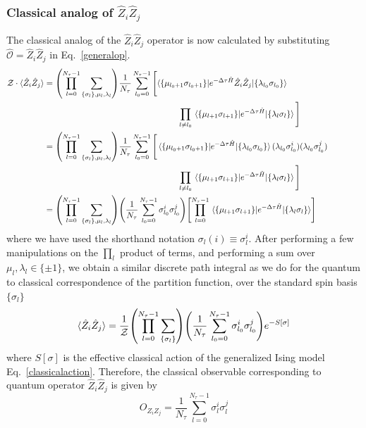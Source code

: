 \documentclass[../thesis_main.tex]{subfiles}
\begin{document}
\subsubsection{Classical analog of $\hat{Z}_i \hat{Z}_j$}
The classical analog of the $\hat{Z}_i \hat{Z}_j$ operator is now calculated by substituting $\hat{\mathcal{O}} =  \hat{Z}_i \hat{Z}_j$ in Eq.~\eqref{generalop}.
\begingroup
\allowdisplaybreaks
\begin{align}
    \mathcal{Z} \cdot \langle {\hat{Z}_i \hat{Z}_j} \rangle &= \qty(\prod_{l=0}^{N_\tau - 1} \sum_{\{\sigma_l \}, \mu_l, \lambda_l}) \frac{1}{N_\tau} \sum_{l_0 = 0}^{N_\tau - 1} \Bigg[\langle\{\mu_{l_0+1} \sigma _{l_0+1}\}|{e^{-\Delta \tau \hat{H}}{\hat{Z}_i \hat{Z}_j}}|{\{\lambda_{l_0} \sigma _{l_0}\}} \rangle \qquad \qquad \nonumber\\
    &\qquad \qquad \qquad \qquad \qquad \qquad \qquad \qquad \prod_{l \neq l_0} \mel{\{\mu_{l+1} \sigma _{l+1}\}}{e^{-\Delta \tau \hat{H}}}{\{\lambda_{l} \sigma _{l}\}} \Bigg] \nonumber \\
    & =  \qty(\prod_{l=0}^{N_\tau - 1} \sum_{\{\sigma_l \}, \mu_l, \lambda_l}) \frac{1}{N_\tau} \sum_{l_0 = 0}^{N_\tau - 1} \Bigg[\mel{\{\mu_{l_0+1} \sigma _{l_0+1}\}}{e^{-\Delta \tau \hat{H}}}{\{\lambda_{l_0} \sigma _{l_0}\}} (\lambda_{l_0} \sigma^i_{l_0})(\lambda_{l_0} \sigma^j_{l_0}) \qquad \qquad \nonumber \\ 
    & \qquad \qquad \qquad \qquad \qquad \qquad \qquad \qquad \prod_{l \neq l_0} \mel{\{\mu_{l+1} \sigma _{l+1}\}}{e^{-\Delta \tau \hat{H}}}{\{\lambda_{l} \sigma _{l}\}}\Bigg] \nonumber \\ 
    & = \qty(\prod_{l=0}^{N_\tau - 1} \sum_{\{\sigma_l \}, \mu_l, \lambda_l}) \qty(\frac{1}{N_\tau} \sum_{l_0 = 0}^{N_\tau - 1} \sigma^i_{l_0} \sigma^j_{l_0}) \qty[\prod_{l = 0}^{N_\tau - 1} \mel{\{\mu_{l+1} \sigma _{l+1}\}}{e^{-\Delta \tau \hat{H}}}{\{\lambda_{l} \sigma _{l}\}}]
\end{align}
\endgroup
where we have used the shorthand notation $\sigma_{l}(i) \equiv \sigma^{i}_l$. After performing a few manipulations on the $\prod_l$ product of terms, and performing a sum over $\mu_l, \lambda_l \in \{\pm 1\}$, we obtain a similar discrete path integral as we do for the quantum to classical correspondence of the partition function, over the standard spin basis $\{\sigma_l\}$
\begin{equation}
    \langle {\hat{Z}_i \hat{Z}_j} \rangle = \frac{1}{\mathcal{Z}} \qty(\prod_{l=0}^{N_\tau - 1} \sum_{\{\sigma_l \}}) \qty(\frac{1}{N_\tau} \sum_{l_0 = 0}^{N_\tau - 1} \sigma^i_{l_0} \sigma^j_{l_0}) e^{-S[\sigma]}
\end{equation}
where $S[\sigma]$ is the effective classical action of the generalized Ising model Eq.~\eqref{classicalaction}. Therefore, the classical observable corresponding to quantum operator $\hat{Z}_i \hat{Z}_j$ is given by
\begin{equation}
    O_{Z_i Z_j} = \frac{1}{N_\tau} \sum_{l = 0}^{N_\tau - 1} \sigma^i_{l} \sigma^j_{l}
    \label{classicalzizj}
\end{equation}~\\
\end{document}
